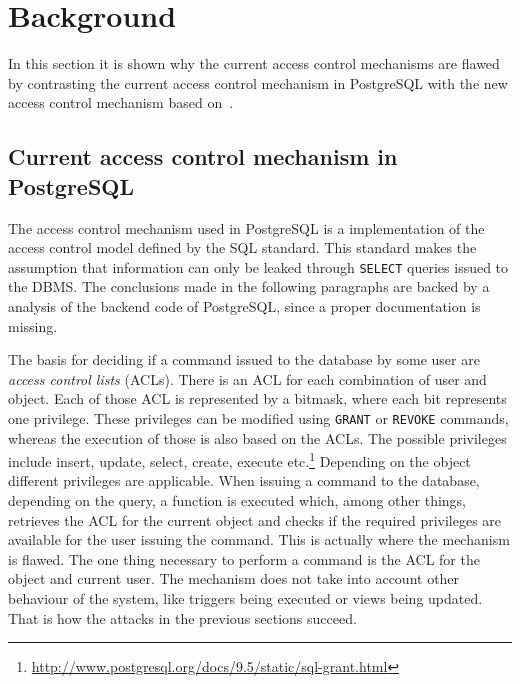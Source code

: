 \section{Background}

In this section it is shown why the current access control mechanisms are flawed by contrasting the current access control mechanism in PostgreSQL with the new access control mechanism based on~\cite{guarnieri2016strong}.
%
\subsection{Current access control mechanism in PostgreSQL}
%
The access control mechanism used in PostgreSQL is a implementation of the access control model defined by the SQL standard.
%
This standard makes the assumption that information can only be leaked through \texttt{SELECT} queries issued to the DBMS.
%
The conclusions made in the following paragraphs are backed by a analysis of the backend code of PostgreSQL, since a proper documentation is missing.

The basis for deciding if a command issued to the database by some user are \emph{access control lists} (ACLs). 
%
There is an ACL for each combination of user and object.
%
Each of those ACL is represented by a bitmask, where each bit represents one privilege.
%
These privileges can be modified using \texttt{GRANT} or \texttt{REVOKE} commands, whereas the execution of those is also based on the ACLs.
%
The possible privileges include insert, update, select, create, execute etc.\footnote{\url{http://www.postgresql.org/docs/9.5/static/sql-grant.html}}
%
Depending on the object different privileges are applicable.
%
When issuing a command to the database, depending on the query, a function is executed which, among other things, retrieves the ACL for the current object and checks if the required privileges are available for the user issuing the command.
%
This is actually where the mechanism is flawed.
% 
The one thing necessary to perform a command is the ACL for the object and current user.
%
The mechanism does not take into account other behaviour of the system, like triggers being executed or views being updated.
%
That is how the attacks in the previous sections succeed.
%
